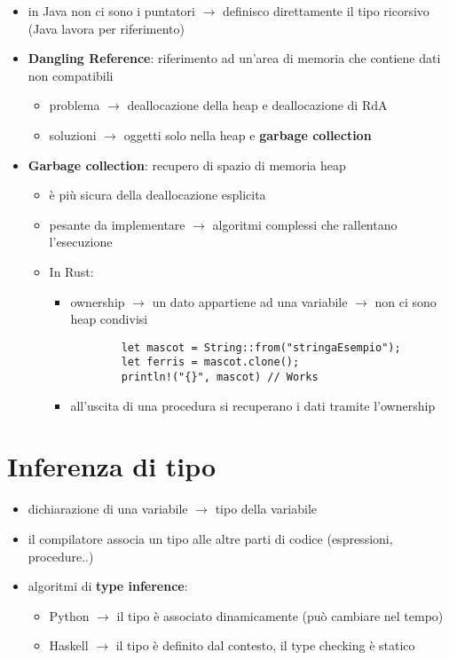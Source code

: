 \documentclass{article}
\begin{document}
\begin{flushleft}
\begin{itemize}
  \item in Java non ci sono i puntatori $\rightarrow$ definisco direttamente il tipo ricorsivo (Java lavora per riferimento)
  \item \textbf{Dangling Reference}: riferimento ad un'area di memoria che contiene dati non compatibili
  \begin{itemize}
    \item problema $\rightarrow$ deallocazione della heap e deallocazione di RdA
    \item soluzioni $\rightarrow$ oggetti solo nella heap e \textbf{garbage collection}
  \end{itemize}
  \item \textbf{Garbage collection}: recupero di spazio di memoria heap 
  \begin{itemize}
    \item è più sicura della deallocazione esplicita
    \item pesante da implementare $\rightarrow$ algoritmi complessi che rallentano l'esecuzione
    \item In Rust:
    \begin{itemize}
      \item ownership $\rightarrow$ un dato appartiene ad una variabile $\rightarrow$ non ci sono heap condivisi
      \begin{lstlisting}
        let mascot = String::from("stringaEsempio");
        let ferris = mascot.clone();
        println!("{}", mascot) // Works
      \end{lstlisting}
      \item all'uscita di una procedura si recuperano i dati tramite l'ownership
    \end{itemize}
  \end{itemize}
\end{itemize}

\medskip

\section*{Inferenza di tipo}
\begin{itemize}
  \item dichiarazione di una variabile $\rightarrow$ tipo della variabile
  \item il compilatore associa un tipo alle altre parti di codice (espressioni, procedure..)
  \item algoritmi di \textbf{type inference}:
  \begin{itemize}
    \item Python $\rightarrow$ il tipo è associato dinamicamente (può cambiare nel tempo)
    \item Haskell $\rightarrow$ il tipo è definito dal contesto, il type checking è statico
  \end{itemize}
\end{itemize}


\end{flushleft}
\end{document}
